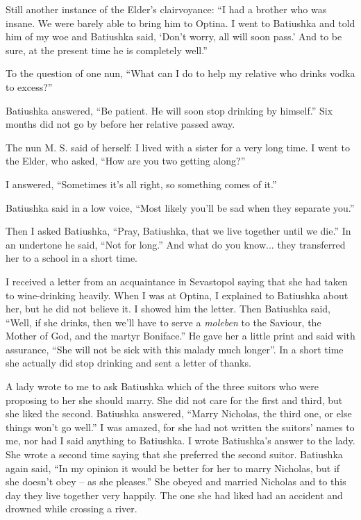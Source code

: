 Still another instance of the Elder's clairvoyance: ``I had a brother who was insane. We were barely able to bring him to Optina. I went to Batiushka and told him of my woe and Batiushka said, `Don't worry, all will soon pass.' And to be sure, at the present time he is completely well.''

To the question of one nun, ``What can I do to help my relative who drinks vodka to excess?''

Batiushka answered, ``Be patient. He will soon stop drinking by himself.'' Six months did not go by before her relative passed away.


\begin{longquote}{The nun M. S. said of herself:}
I lived with a sister for a very long time. I went to the Elder, who asked, ``How are you two getting along?''

I answered, ``Sometimes it's all right, so something comes of it.''

Batiushka said in a low voice, ``Most likely you'll be sad when they separate you.''

Then I asked Batiushka, ``Pray, Batiushka, that we live together until we die.'' In an undertone he said, ``Not for long.'' And what do you know... they transferred her to a school in a short time.

I received a letter from an acquaintance in Sevastopol saying that she had taken to wine-drinking heavily. When I was at Optina, I explained to Batiushka about her, but he did not believe it. I showed him the letter. Then Batiushka said, ``Well, if she drinks, then we'll have to serve a \textit{moleben} to the Saviour, the Mother of God, and the martyr Boniface.'' He gave her a little print and said with assurance, ``She will not be sick with this malady much longer''. In a short time she actually did stop drinking and sent a letter of thanks.

A lady wrote to me to ask Batiushka which of the three suitors who were proposing to her she should marry. She did not care for the first and third, but she liked the second. Batiushka answered, ``Marry Nicholas, the third one, or else things won't go well.'' I was amazed, for she had not written the suitors' names to me, nor had I said anything to Batiushka. I wrote Batiushka's answer to the lady. She wrote a second time saying that she preferred the second suitor. Batiushka again said, ``In my opinion it would be better for her to marry Nicholas, but if she doesn't obey -- as she pleases.'' She obeyed and married Nicholas and to this day they live together very happily. The one she had liked had an accident and drowned while crossing a river.
\end{longquote}

